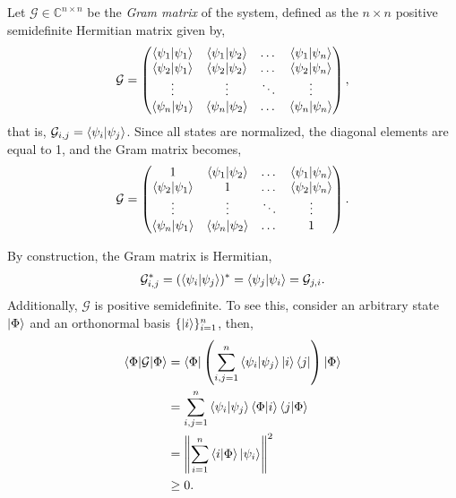 \documentclass[12pt,letterpaper]{article}
\begin{document}
\begin{multicols}{2}
Let $\mathcal{G} \in \mathbb{C}^{n \times n}$ be the \emph{Gram matrix} of the system, defined as the $n \times n$ positive semidefinite Hermitian matrix given by,
\begin{equation*}
	\mathcal{G} =
	\begin{pmatrix}
		\braket{\psi_1|\psi_1} & \braket{\psi_1|\psi_2} & \dots & \braket{\psi_1|\psi_n} \\
		\braket{\psi_2|\psi_1} & \braket{\psi_2|\psi_2} & \dots & \braket{\psi_2|\psi_n} \\
		\vdots & \vdots & \ddots & \vdots \\
		\braket{\psi_n|\psi_1} & \braket{\psi_n|\psi_2} & \dots & \braket{\psi_n|\psi_n}
	\end{pmatrix},
\end{equation*}
that is, $\mathcal{G}_{i,j} = \braket{\psi_i|\psi_j}$. Since all states are normalized, the diagonal elements are equal to 1, and the Gram matrix becomes,
\begin{equation*}
	\mathcal{G} =
	\begin{pmatrix}
		1 & \braket{\psi_1|\psi_2} & \dots & \braket{\psi_1|\psi_n} \\
		\braket{\psi_2|\psi_1} & 1 & \dots & \braket{\psi_2|\psi_n} \\
		\vdots & \vdots & \ddots & \vdots \\
		\braket{\psi_n|\psi_1} & \braket{\psi_n|\psi_2} & \dots & 1
	\end{pmatrix}.
\end{equation*}

By construction, the Gram matrix is Hermitian,
\begin{align*}
	\mathcal{G}_{i,j}^* = (\braket{\psi_i|\psi_j})^* = \braket{\psi_j|\psi_i} = \mathcal{G}_{j,i}.
\end{align*}
Additionally, $\mathcal{G}$ is positive semidefinite. To see this, consider an arbitrary state $\ket{\Phi}$ and an orthonormal basis $\{\ket{i}\}_{i=1}^n$, then,
\begin{align*}
	\braket{\Phi|\mathcal{G}|\Phi} &= \braket{\Phi| \left( \sum_{i,j=1}^{n} \braket{\psi_i|\psi_j} \ket{i}\bra{j} \right) |\Phi} \\
	&= \sum_{i,j=1}^{n} \braket{\psi_i|\psi_j} \braket{\Phi|i} \braket{j|\Phi} \\
	&= \left\| \sum_{i=1}^{n} \braket{i|\Phi} \ket{\psi_i} \right\|^2 \\
	&\geq 0.
\end{align*}


\end{multicols}
\end{document}
